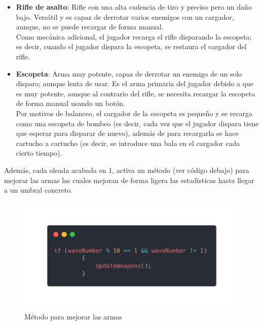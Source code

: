 \documentclass[12pt]{article}
\begin{document}
            \begin{itemize}
            
                \item \textbf{Rifle de asalto}: Rifle con una alta cadencia de tiro y preciso pero un daño bajo. Versátil y es capaz de derrotar varios enemigos con un cargador, aunque, no se puede recargar de forma manual.\\ Como mecánica adicional, el jugador recarga el rifle disparando la escopeta; es decir, cuando el jugador dispara la escopeta, se restaura el cargador del rifle.\\
                
                \item \textbf{Escopeta}: Arma muy potente, capaz de derrotar un enemigo de un solo disparo; aunque lenta de usar. Es el arma primaria del jugador debido a que es muy potente, aunque al contrario del rifle, se necesita recargar la escopeta de forma manual usando un botón.\\ 
                Por motivos de balanceo, el cargador de la escopeta es pequeño y se recarga como una escopeta de bombeo (es decir, cada vez que el jugador dispara tiene que esperar para disparar de nuevo), además de para recargarla se hace cartucho a cartucho (es decir, se introduce una bala en el cargador cada cierto tiempo).\\
            \end{itemize}

        
        Además, cada oleada acabada en 1, activa un método (ver código debajo) para mejorar las armas las cuales mejoran de forma ligera las estadísticas hasta llegar a un umbral concreto.
        
    \begin{figure}[H]
        \centering
        \includegraphics[width=\textwidth]{Images/Menuprincipal/wavnumber.png}
        \caption{Método para mejorar las armas}
    \end{figure}
\end{document}
